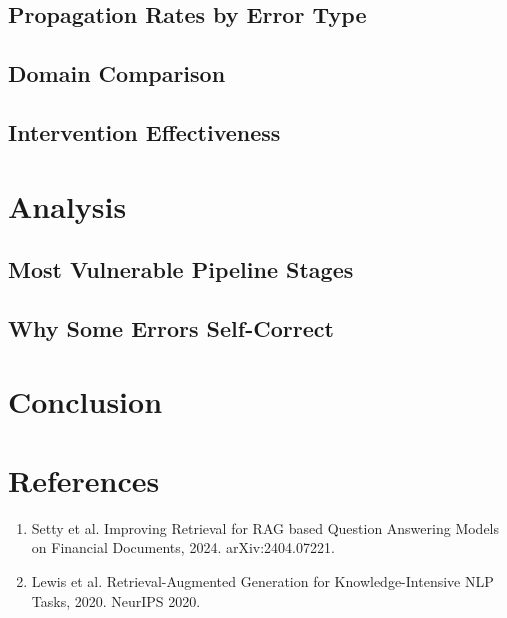 \documentclass{article}
\begin{document}
\subsection{Propagation Rates by Error Type}
\subsection{Domain Comparison}
\subsection{Intervention Effectiveness}

\section{Analysis}
\subsection{Most Vulnerable Pipeline Stages}
\subsection{Why Some Errors Self-Correct}

\section{Conclusion}

\section*{References}
\small
\begin{enumerate}
    \item Setty et al. Improving Retrieval for RAG based Question Answering Models on Financial Documents, 2024. arXiv:2404.07221.
    \item Lewis et al. Retrieval-Augmented Generation for Knowledge-Intensive NLP Tasks, 2020. NeurIPS 2020.
\end{enumerate}
\end{document}
